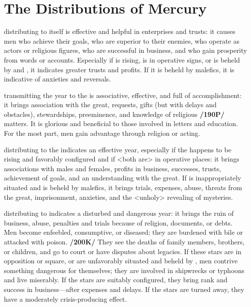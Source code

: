\section{The Distributions of Mercury}

\Mercury\xspace distributing to itself is effective and helpful in enterprises and trusts: it causes men who achieve their goals, who are superior to their enemies, who operate as actors or religious figures, who are successful in business, and who gain prosperity from words or accounts. Especially if \Mercury\xspace is rising, is in operative signs, or is beheld by \Jupiter\xspace and \Venus, it indicates greater trusts and profits. If it is beheld by malefics, it is indicative of anxieties and reversals.

\Mercury\xspace transmitting the year to the \Sun\xspace is associative, effective, and full of accomplishment: it brings
association with the great, requests, gifts (but with delays and obstacles), stewardships, preeminence, and knowledge of religious \textbf{/190P/} matters. It is glorious and beneficial to those involved in letters and education. For the most part, men gain advantage through religion or acting.

\Mercury\xspace distributing to the\Moon\xspace indicates an effective year, especially if the \Moon\xspace happens to be
rising and favorably configured and if <both are> in operative places: it brings associations with males and
females, profits in business, successes, trusts, achievement of goals, and an understanding with the great. If \Mercury\xspace is inappropriately situated and is beheld by malefics, it brings trials, expenses, abuse, threats from the great, imprisonment, anxieties, and the <unholy> revealing of mysteries.

\Mercury\xspace distributing to \Saturn\xspace indicates a disturbed and dangerous year: it brings the ruin of business,
abuse, penalties and trials because of religion, documents, or debts. Men become enfeebled, consumptive, or diseased; they are burdened with bile or attacked with poison. \textbf{/200K/} They see the deaths of family members, brothers, or children, and go to court or have disputes about legacies. If these stars are in opposition or square, or are unfavorably situated and beheld by \Mars, men contrive something dangerous for themselves; they are involved in shipwrecks or typhoons and live miserably. If the stars are suitably configured, they bring rank and success in business—after expenses and delays. If the stars are turned away, they have a moderately crisis-producing effect.

